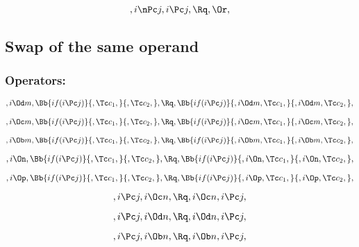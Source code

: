 \[,i \nPc j, i \Pc j, \Rq , \Or,\]




\bigskip
\bigskip
\bigskip
\bigskip
\subsection{ Swap  of the same operand}


\subsubsection{Operators:} 
\[, i \Od m, \Bb{if(i \Pc j)}{, \Tc c_1,}{, \Tc c_2,}, \Rq , \Bb{if(i \Pc j)}{,i \Od m, \Tc c_1,}{,i \Od m, \Tc c_2,},\]


\bigskip
\bigskip
\[, i \Oc m, \Bb{if(i \Pc j)}{, \Tc c_1,}{, \Tc c_2,}, \Rq , \Bb{if(i \Pc j)}{,i \Oc m, \Tc c_1,}{,i \Oc m, \Tc c_2,},\]

\bigskip
\bigskip
\[, i \Ob m, \Bb{if(i \Pc j)}{, \Tc c_1,}{, \Tc c_2,}, \Rq , \Bb{if(i \Pc j)}{,i \Ob m, \Tc c_1,}{,i \Ob m, \Tc c_2,},\]

\bigskip
\bigskip
\[, i \On, \Bb{if(i \Pc j)}{, \Tc c_1,}{, \Tc c_2,}, \Rq , \Bb{if(i \Pc j)}{,i \On, \Tc c_1,}{,i \On, \Tc c_2,},\]

\bigskip
\bigskip
\[, i \Op, \Bb{if(i \Pc j)}{, \Tc c_1,}{, \Tc c_2,}, \Rq , \Bb{if(i \Pc j)}{,i \Op, \Tc c_1,}{,i \Op, \Tc c_2,},\]


\bigskip
\bigskip

\[, i \Pc j, i \Oc n, \Rq , i \Oc n, i \Pc j,\]

\[, i \Pc j, i \Od n, \Rq , i \Od n, i \Pc j,\]

\[, i \Pc j, i \Ob n, \Rq , i \Ob n, i \Pc j,\]

